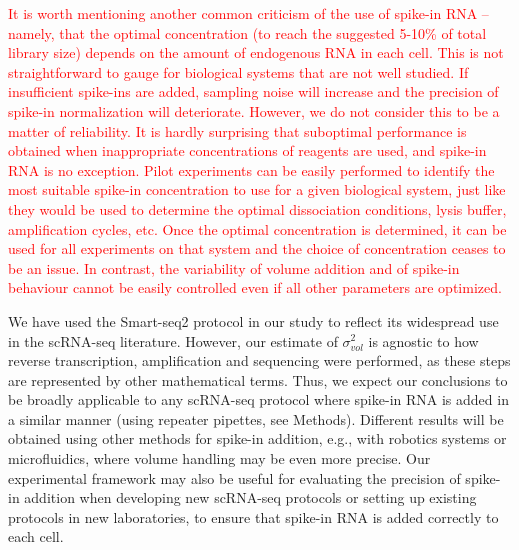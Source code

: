 \documentclass{article}
\newcommand{\revised}[1]{\textcolor{red}{#1}}
\begin{document}
\revised{It is worth mentioning another common criticism of the use of spike-in RNA -- namely, that the optimal concentration (to reach the suggested 5-10\% of total library size) depends on the amount of endogenous RNA in each cell.
This is not straightforward to gauge for biological systems that are not well studied.
If insufficient spike-ins are added, sampling noise will increase and the precision of spike-in normalization will deteriorate.
However, we do not consider this to be a matter of reliability.
It is hardly surprising that suboptimal performance is obtained when inappropriate concentrations of reagents are used, and spike-in RNA is no exception.
Pilot experiments can be easily performed to identify the most suitable spike-in concentration to use for a given biological system, just like they would be used to determine the optimal dissociation conditions, lysis buffer, amplification cycles, etc.
Once the optimal concentration is determined, it can be used for all experiments on that system and the choice of concentration ceases to be an issue.
In contrast, the variability of volume addition and of spike-in behaviour cannot be easily controlled even if all other parameters are optimized. 
}

We have used the Smart-seq2 protocol in our study to reflect its widespread use in the scRNA-seq literature.
However, our estimate of $\sigma^2_{vol}$ is agnostic to how reverse transcription, amplification and sequencing were performed, as these steps are represented by other mathematical terms.
Thus, we expect our conclusions to be broadly applicable to any scRNA-seq protocol where spike-in RNA is added in a similar manner (using repeater pipettes, see Methods).
Different results will be obtained using other methods for spike-in addition, e.g., with robotics systems or microfluidics, where volume handling may be even more precise.
Our experimental framework may also be useful for evaluating the precision of spike-in addition when developing new scRNA-seq protocols or setting up existing protocols in new laboratories, to ensure that spike-in RNA is added correctly to each cell.
\end{document}
